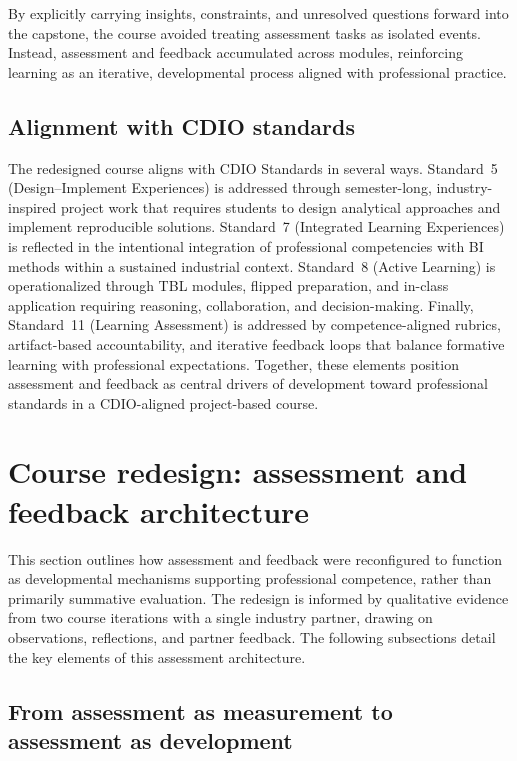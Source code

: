 By explicitly carrying insights, constraints, and unresolved questions forward into the capstone, the course avoided treating assessment tasks as isolated events. Instead, assessment and feedback accumulated across modules, reinforcing learning as an iterative, developmental process aligned with professional practice.

\subsection{Alignment with CDIO standards}

The redesigned course aligns with CDIO Standards in several ways. Standard~5 (Design--Implement Experiences) is addressed through semester-long, industry-inspired project work that requires students to design analytical approaches and implement reproducible solutions. Standard~7 (Integrated Learning Experiences) is reflected in the intentional integration of professional competencies with BI methods within a sustained industrial context. Standard~8 (Active Learning) is operationalized through TBL modules, flipped preparation, and in-class application requiring reasoning, collaboration, and decision-making. Finally, Standard~11 (Learning Assessment) is addressed by competence-aligned rubrics, artifact-based accountability, and iterative feedback loops that balance formative learning with professional expectations.
%
Together, these elements position assessment and feedback as central drivers of development toward professional standards in a CDIO-aligned project-based course.

\section{Course redesign: assessment and feedback architecture}
This section outlines how assessment and feedback were reconfigured to function as developmental mechanisms supporting professional competence, rather than primarily summative evaluation. The redesign is informed by qualitative evidence from two course iterations with a single industry partner, drawing on observations, reflections, and partner feedback. The following subsections detail the key elements of this assessment architecture.



\subsection{From assessment as measurement to assessment as development}

